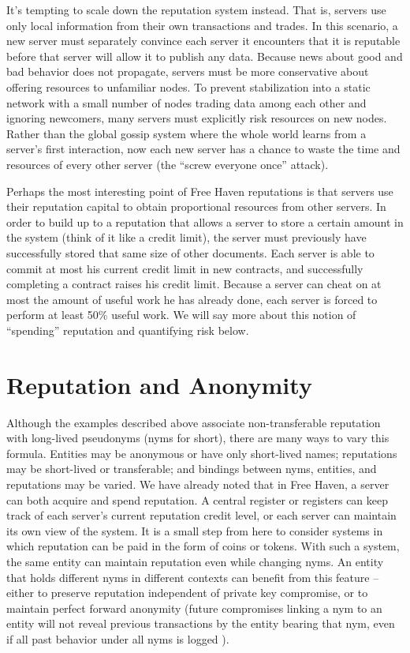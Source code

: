 \documentclass[times,10pt,twocolumn]{article}
\begin{document}
It's tempting to scale down the reputation system instead. That is,
servers use only local information from their own transactions and
trades. In this scenario, a new server must separately convince each
server it encounters that it is reputable before that server will
allow it to publish any data. Because news about good and bad behavior
does not propagate, servers must be more conservative about offering
resources to unfamiliar nodes. To prevent stabilization into a static
network with a small number of nodes trading data among each other and
ignoring newcomers, many servers must explicitly risk resources on new
nodes. Rather than the global gossip system where the whole world learns
from a server's first interaction, now each new server has a chance to
waste the time and resources of every other server (the ``screw everyone
once'' attack).

Perhaps the most interesting point of Free Haven reputations is that
servers use their reputation capital to obtain proportional resources
from other servers. In order to build up to a reputation that allows
a server to store a certain amount in the system (think of it like a
credit limit), the server must previously have successfully stored that
same size of other documents. Each server is able to commit at most his
current credit limit in new contracts, and successfully completing a
contract raises his credit limit. Because a server can cheat on at most
the amount of useful work he has already done, each server is forced to
perform at least 50\% useful work. We will say more about this notion of
``spending'' reputation and quantifying risk below.

\section{Reputation and Anonymity}

Although the examples described above associate non-transferable
reputation with long-lived pseudonyms (nyms for short), there are many
ways to vary this formula. Entities may be anonymous or have only
short-lived names; reputations may be short-lived or transferable;
and bindings between nyms, entities, and reputations may be varied.
We have already noted that in Free Haven, a server can both acquire and
spend reputation. A central register or registers can keep track of each
server's current reputation credit level, or each server can maintain its
own view of the system. It is a small step from here to consider systems
in which reputation can be paid in the form of coins or tokens. With such
a system, the same entity can maintain reputation even while changing
nyms. An entity that holds different nyms in different
contexts can benefit from this feature -- either to preserve reputation
independent of private key compromise, or to maintain perfect forward
anonymity (future compromises linking a nym to an entity will not reveal
previous transactions by the entity bearing that nym, even if all past
behavior under all nyms is logged \cite{unlinkable-serial-transactions}).
\end{document}

